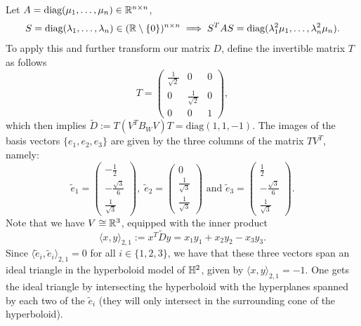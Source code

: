 Let \(A = \text{diag}(\mu_1,\ldots,\mu_n)\in\mathbb{R}^{n\times n}\),
\begin{equation*}
    S=\text{diag}(\lambda_1,\ldots, \lambda_n)\in(\mathbb{R}\setminus\{0\})^{n\times n} \implies S^TAS = \text{diag}(\lambda_1^2\mu_1,\ldots,\lambda_n^2\mu_n).
\end{equation*}
To apply this and further transform our matrix \(D\), define the invertible matrix \(T\) as follows
\[T = \begin{pmatrix} \frac{1}{\sqrt{2}} & 0 & 0 \\ 0 & \frac{1}{\sqrt{2}} & 0 \\ 0 & 0 & 1 \end{pmatrix},\]
which then implies \(\widetilde{D} := T(V^T B_W V)T = \text{diag}(1,1,-1)\).
The images of the basis vectors \(\{e_1,e_2,e_3\}\) are given by the three columns of the matrix \(TV^T\), namely:
\begin{equation*}
    \widetilde{e}_1 = \begin{pmatrix} -\frac{1}{2} \\ - \frac{\sqrt{3}}{6} \\ \frac{1}{\sqrt{3}} \end{pmatrix},\;
    \widetilde{e}_2 = \begin{pmatrix} 0 \\ \frac{1}{\sqrt{3}} \\ \frac{1}{\sqrt{3}} \end{pmatrix} \text{ and }
    \widetilde{e}_3 = \begin{pmatrix} \frac{1}{2} \\ -\frac{\sqrt{3}}{6} \\ \frac{1}{\sqrt{3}} \end{pmatrix}.
\end{equation*}
Note that we have \(V\cong \mathbb{R}^3\), equipped with the inner product
\[\langle x, y \rangle_{2,1} := x^T\widetilde{D}y = x_1y_1 + x_2y_2 - x_3y_3.\]
Since \(\langle \widetilde{e}_i, \widetilde{e}_i \rangle_{2,1} = 0\) for all \(i\in \{1,2,3\}\), we have that these three vectors span an ideal triangle in the hyperboloid model of \(\mathbb{H}^2\), given by \(\langle x, y \rangle_{2,1} = -1\).
One gets the ideal triangle by intersecting the hyperboloid with the hyperplanes spanned by each two of the \(\widetilde{e}_i\) (they will only intersect in the surrounding cone of the hyperboloid).


